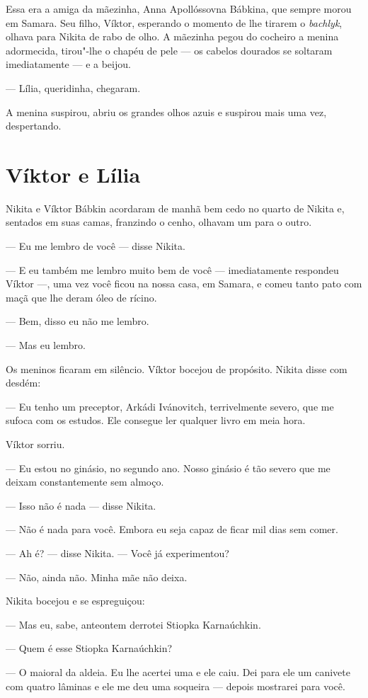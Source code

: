 Essa era a amiga da mãezinha, Anna Apollóssovna Bábkina, que sempre
morou em Samara. Seu filho, Víktor, esperando o momento de lhe tirarem o
\emph{bachlyk}, olhava para Nikita de rabo de olho. A mãezinha pegou do
cocheiro a menina adormecida, tirou"-lhe o chapéu de pele --- os cabelos
dourados se soltaram imediatamente --- e a beijou.

--- Lília, queridinha, chegaram.

A menina suspirou, abriu os grandes olhos azuis e suspirou mais uma vez,
despertando.

\chapter{Víktor e Lília}

Nikita e Víktor Bábkin acordaram de manhã bem cedo no quarto de Nikita
e, sentados em suas camas, franzindo o cenho, olhavam um para o outro.

--- Eu me lembro de você --- disse Nikita.

--- E eu também me lembro muito bem de você --- imediatamente respondeu
Víktor ---, uma vez você ficou na nossa casa, em Samara, e comeu tanto
pato com maçã que lhe deram óleo de rícino.

--- Bem, disso eu não me lembro.

--- Mas eu lembro.

Os meninos ficaram em silêncio. Víktor bocejou de propósito. Nikita
disse com desdém:

--- Eu tenho um preceptor, Arkádi Ivánovitch, terrivelmente severo, que
me sufoca com os estudos. Ele consegue ler qualquer livro em meia hora.

Víktor sorriu.

--- Eu estou no ginásio, no segundo ano. Nosso ginásio é tão severo que
me deixam constantemente sem almoço.

--- Isso não é nada --- disse Nikita.

--- Não é nada para você. Embora eu seja capaz de ficar mil dias sem
comer.

--- Ah é? --- disse Nikita. --- Você já experimentou?

--- Não, ainda não. Minha mãe não deixa.

Nikita bocejou e se espreguiçou:

--- Mas eu, sabe, anteontem derrotei Stiopka Karnaúchkin.

--- Quem é esse Stiopka Karnaúchkin?

--- O maioral da aldeia. Eu lhe acertei uma e ele caiu. Dei para ele um
canivete com quatro lâminas e ele me deu uma soqueira --- depois
mostrarei para você.

